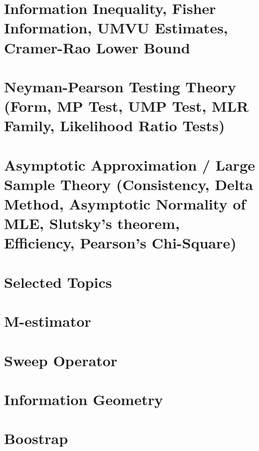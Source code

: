 \section{Information Inequality, Fisher Information, UMVU Estimates, Cramer-Rao Lower Bound}
\section{Neyman-Pearson Testing Theory (Form, MP Test, UMP Test, MLR Family, Likelihood Ratio Tests)}
\section{Asymptotic Approximation / Large Sample Theory (Consistency, Delta Method, Asymptotic Normality of MLE, Slutsky's theorem, Efficiency, Pearson's Chi-Square)}

\section{Selected Topics}
\section{M-estimator}
\section{Sweep Operator}
\section{Information Geometry}
\section{Boostrap}







